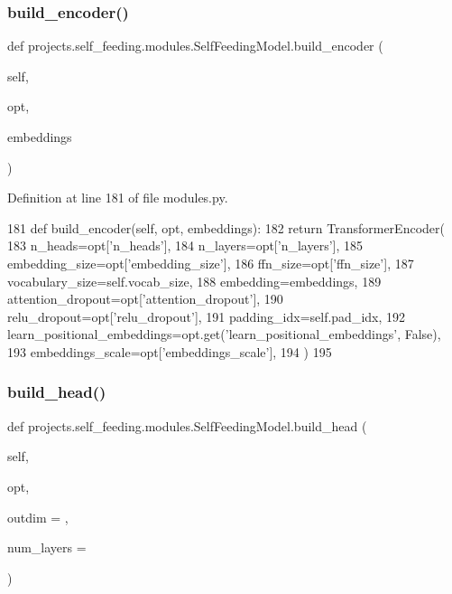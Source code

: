 \subsubsection{\texorpdfstring{build\+\_\+encoder()}{build\_encoder()}}
{\footnotesize\ttfamily def projects.\+self\+\_\+feeding.\+modules.\+Self\+Feeding\+Model.\+build\+\_\+encoder (\begin{DoxyParamCaption}\item[{}]{self,  }\item[{}]{opt,  }\item[{}]{embeddings }\end{DoxyParamCaption})}



Definition at line 181 of file modules.\+py.


\begin{DoxyCode}
181     \textcolor{keyword}{def }build\_encoder(self, opt, embeddings):
182         \textcolor{keywordflow}{return} TransformerEncoder(
183             n\_heads=opt[\textcolor{stringliteral}{'n\_heads'}],
184             n\_layers=opt[\textcolor{stringliteral}{'n\_layers'}],
185             embedding\_size=opt[\textcolor{stringliteral}{'embedding\_size'}],
186             ffn\_size=opt[\textcolor{stringliteral}{'ffn\_size'}],
187             vocabulary\_size=self.vocab\_size,
188             embedding=embeddings,
189             attention\_dropout=opt[\textcolor{stringliteral}{'attention\_dropout'}],
190             relu\_dropout=opt[\textcolor{stringliteral}{'relu\_dropout'}],
191             padding\_idx=self.pad\_idx,
192             learn\_positional\_embeddings=opt.get(\textcolor{stringliteral}{'learn\_positional\_embeddings'}, \textcolor{keyword}{False}),
193             embeddings\_scale=opt[\textcolor{stringliteral}{'embeddings\_scale'}],
194         )
195 
\end{DoxyCode}
\mbox{\label{classprojects_1_1self__feeding_1_1modules_1_1SelfFeedingModel_a1c493d21cd4aa3e296e5d2f1830c0b06}} 
\subsubsection{\texorpdfstring{build\+\_\+head()}{build\_head()}}
{\footnotesize\ttfamily def projects.\+self\+\_\+feeding.\+modules.\+Self\+Feeding\+Model.\+build\+\_\+head (\begin{DoxyParamCaption}\item[{}]{self,  }\item[{}]{opt,  }\item[{}]{outdim = {},  }\item[{}]{num\+\_\+layers = {} }\end{DoxyParamCaption})}



